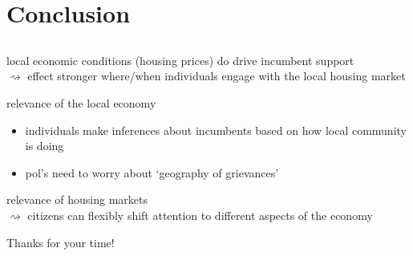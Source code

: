 \documentclass[10pt,aspectratio=169]{beamer}
\begin{document}
\section{Conclusion}
\subsection{}
\begin{frame}
local economic conditions (housing prices) do drive incumbent support \\ \pause
$\rightsquigarrow$ effect stronger where/when individuals engage with the local housing market \pause

\vspace{0.2in}
relevance of the local economy  \pause
\begin{itemize}[<+->]
\item individuals make inferences about incumbents based on how local community is doing
\item pol's need to worry about `geography of grievances'
\end{itemize}

\vspace{0.2in} \pause
relevance of housing markets \\ \pause
$\rightsquigarrow$ citizens can flexibly shift attention to different aspects of the economy
\end{frame}

\begin{frame}
\centering
Thanks for your time!
\end{frame}

\appendix

	
\end{document}
